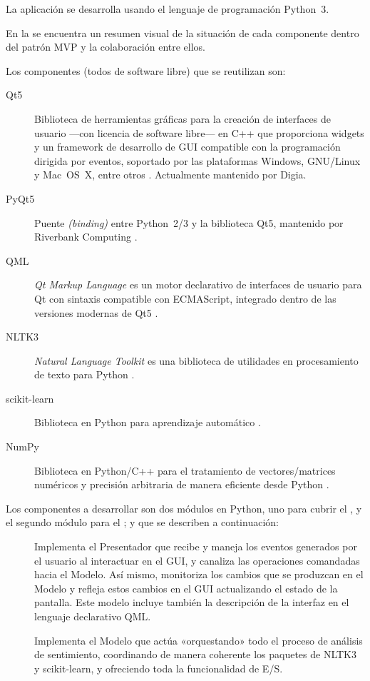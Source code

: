 La aplicación se desarrolla usando el lenguaje de programación Python~3.

En la  se encuentra un resumen visual de la situación de cada componente dentro del patrón MVP y la colaboración entre ellos.

Los componentes (todos de software libre) que se reutilizan son:
\begin{description}
\item[Qt5] Biblioteca de herramientas gráficas para la creación de interfaces de usuario ---con licencia de software libre--- en C++ que proporciona widgets y un framework de desarrollo de GUI compatible con la programación dirigida por eventos, soportado por las plataformas Windows, GNU/Linux y Mac~OS~X, entre otros \citep{Huang2015}. Actualmente mantenido por Digia.
\item[PyQt5] Puente \emph{(binding)} entre Python~2/3 y la biblioteca Qt5, mantenido por Riverbank Computing \citep{Summerfield2008}.
\item[QML] \emph{Qt Markup Language} es un motor declarativo de interfaces de usuario para Qt con sintaxis compatible con ECMAScript, integrado dentro de las versiones modernas de Qt5 \citep{web:QmlBook}.
\item[NLTK3] \emph{Natural Language Toolkit} es una biblioteca de utilidades en procesamiento de texto para Python \citep{Perkins2014}.
\item[scikit-learn] Biblioteca en Python para aprendizaje automático \citep{Pedregosa2011}.
\item[NumPy] Biblioteca en Python/C++ para el tratamiento de vectores/matrices numéricos y precisión arbitraria de manera eficiente desde Python \citep{Bressert2012}.
\end{description}

Los componentes a desarrollar son dos módulos en Python, uno para cubrir el , y el segundo módulo para el ; y que se describen a continuación:
\begin{description}
\item[] Implementa el Presentador que recibe y maneja los eventos generados por el usuario al interactuar en el GUI, y canaliza las operaciones comandadas hacia el Modelo. Así mismo, monitoriza los cambios que se produzcan en el Modelo y refleja estos cambios en el GUI actualizando el estado de la pantalla. Este modelo incluye también la descripción de la interfaz en el lenguaje declarativo QML.
\item[] Implementa el Modelo que actúa «orquestando» todo el proceso de análisis de sentimiento, coordinando de manera coherente los paquetes de NLTK3 y scikit-learn, y ofreciendo toda la funcionalidad de E/S.
\end{description}

